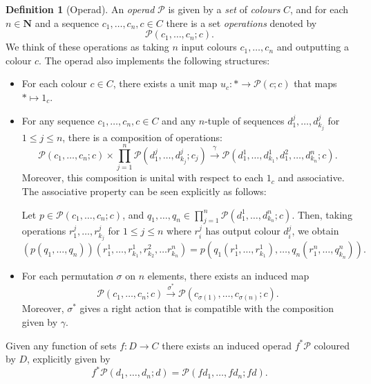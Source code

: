 \documentclass[11pt, reqno]{amsart}
\theoremstyle{definition}
\newtheorem{definition}[theorem]{Definition}
\renewcommand{\leq}{\leqslant}
\newcommand{\N}{\mathbf{N}}
\newcommand{\operad}{\mathcal}
\begin{document}
\begin{definition}[Operad]
\label{def:operad}
An \emph{operad} \(\operad P\) is given by a \emph{set} of \emph{colours} \(C\),
and for each \(n \in \N\) and a sequence \(c_1, \dots, c_n, c \in C\) there is a set
\emph{operations} denoted by
\[
\operad P(c_1, \ldots, c_n; c).
\]
We think of these operations as taking \(n\) input colours \(c_1, \dots, c_n\)
and outputting a colour \(c\). The operad also implements the following structures:
\begin{itemize}\setlength\itemsep{0em}
\item For each colour \(c \in C\), there exists a unit map
  \(u_c: * \to \operad P(c; c)\) that maps \(* \mapsto 1_c\).

\item For any sequence \(c_1, \dots, c_n, c \in C\) and any \(n\)-tuple of
  sequences \(d_1^j, \dots, d_{k_j}^j\) for \(1 \leq j \leq n\), there is a
  composition of operations:
  \[
  \operad P(c_1, \dots, c_n; c)
  \times \prod_{j=1}^n \operad P(d_1^j, \dots, d_{k_j}^j; c_j)
  \overset{\gamma}\longrightarrow
  \operad P(d_1^1, \dots, d_{k_1}^1, d_1^2, \dots, d_{k_n}^n; c).
  \]
  Moreover, this composition is unital with respect to each \(1_c\) and
  associative.  The associative property can be seen explicitly as follows:

  Let \(p \in \operad P(c_1, \dots, c_n; c)\), and
  \(q_1, \dots, q_n \in \prod_{j=1}^n \operad P(d_1^1, \dots, d_{k_n}^n; c)\). Then,
  taking operations \(r_1^j, \dots, r_{k_j}^j\) for \(1 \leq j \leq n\) where
  \(r_i^j\) has output colour \(d_i^j\), we obtain
  \[
  (p(q_1, \dots, q_n))(r_1^1, \dots, r_{k_1}^1, r_{k_2}^2, \dots r_{k_n}^n)
  = p(q_1(r_1^1, \dots, r_{k_1}^1), \dots, q_n(r_1^n, \dots, q_{k_n}^n)).
  \]


\item For each permutation \(\sigma\) on \(n\) elements, there exists an induced map
  \[
  \operad P(c_1, \dots, c_n; c)
  \overset{\sigma^{*}}\longrightarrow
  \operad P(c_{\sigma(1)}, \dots, c_{\sigma(n)}; c).
  \]
  Moreover, \(\sigma^{*}\) gives a right action that is compatible with the
  composition given by \(\gamma\).
\end{itemize}
\end{definition}

Given any function of sets \(f: D \to C\) there exists an induced operad
\(f^{*} \operad P\) coloured by \(D\), explicitly given by
\[
f^{*} \operad P(d_1, \dots, d_n; d) = \operad P(f d_1, \dots, f d_n; f d).
\]
\end{document}

